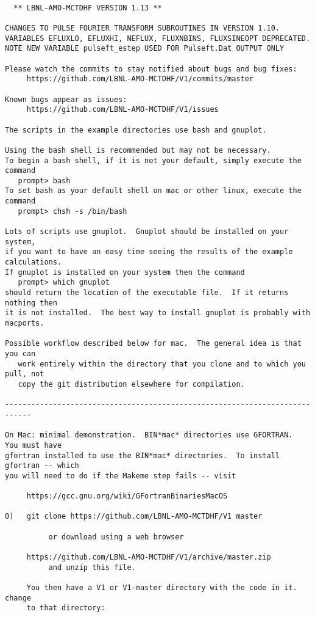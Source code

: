 \begin{verbatim}

  ** LBNL-AMO-MCTDHF VERSION 1.13 **

CHANGES TO PULSE FOURIER TRANSFORM SUBROUTINES IN VERSION 1.10.
VARIABLES EFLUXLO, EFLUXHI, NEFLUX, FLUXNBINS, FLUXSINEOPT DEPRECATED.
NOTE NEW VARIABLE pulseft_estep USED FOR Pulseft.Dat OUTPUT ONLY

Please watch the commits to stay notified about bugs and bug fixes:
     https://github.com/LBNL-AMO-MCTDHF/V1/commits/master

Known bugs appear as issues:
     https://github.com/LBNL-AMO-MCTDHF/V1/issues

The scripts in the example directories use bash and gnuplot.  

Using the bash shell is recommended but may not be necessary.
To begin a bash shell, if it is not your default, simply execute the command
   prompt> bash
To set bash as your default shell on mac or other linux, execute the command
   prompt> chsh -s /bin/bash

Lots of scripts use gnuplot.  Gnuplot should be installed on your system,
if you want to have an easy time seeing the results of the example calculations.
If gnuplot is installed on your system then the command
   prompt> which gnuplot
should return the location of the executable file.  If it returns nothing then
it is not installed.  The best way to install gnuplot is probably with macports.

Possible workflow described below for mac.  The general idea is that you can 
   work entirely within the directory that you clone and to which you pull, not 
   copy the git distribution elsewhere for compilation.

----------------------------------------------------------------------------

On Mac: minimal demonstration.  BIN*mac* directories use GFORTRAN.  You must have
gfortran installed to use the BIN*mac* directories.  To install gfortran -- which
you will need to do if the Makeme step fails -- visit 

     https://gcc.gnu.org/wiki/GFortranBinariesMacOS

0)   git clone https://github.com/LBNL-AMO-MCTDHF/V1 master

          or download using a web browser

     https://github.com/LBNL-AMO-MCTDHF/V1/archive/master.zip
          and unzip this file.

     You then have a V1 or V1-master directory with the code in it.  change
     to that directory:


\end{verbatim}
